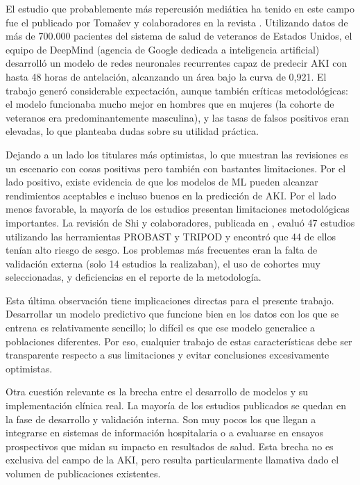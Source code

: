 \documentclass[12pt, a4paper, oneside]{report}
\begin{document}
El estudio que probablemente más repercusión mediática ha tenido en este campo fue el publicado por Tomašev y colaboradores en la revista \parencite{tomasev2019nature}. Utilizando datos de más de 700.000 pacientes del sistema de salud de veteranos de Estados Unidos, el equipo de DeepMind (agencia de Google dedicada a inteligencia artificial) desarrolló un modelo de redes neuronales recurrentes capaz de predecir AKI con hasta 48 horas de antelación, alcanzando un área bajo la curva de 0,921. El trabajo generó considerable expectación, aunque también críticas metodológicas: el modelo funcionaba mucho mejor en hombres que en mujeres (la cohorte de veteranos era predominantemente masculina), y las tasas de falsos positivos eran elevadas, lo que planteaba dudas sobre su utilidad práctica.

Dejando a un lado los titulares más optimistas, lo que muestran las revisiones es un escenario con cosas positivas pero también con bastantes limitaciones. Por el lado positivo, existe evidencia de que los modelos de ML pueden alcanzar rendimientos aceptables e incluso buenos en la predicción de AKI. Por el lado menos favorable, la mayoría de los estudios presentan limitaciones metodológicas importantes. La revisión de Shi y colaboradores, publicada en \parencite{shi2025aiaki}, evaluó 47 estudios utilizando las herramientas PROBAST y TRIPOD y encontró que 44 de ellos tenían alto riesgo de sesgo. Los problemas más frecuentes eran la falta de validación externa (solo 14 estudios la realizaban), el uso de cohortes muy seleccionadas, y deficiencias en el reporte de la metodología.

Esta última observación tiene implicaciones directas para el presente trabajo. Desarrollar un modelo predictivo que funcione bien en los datos con los que se entrena es relativamente sencillo; lo difícil es que ese modelo generalice a poblaciones diferentes. Por eso, cualquier trabajo de estas características debe ser transparente respecto a sus limitaciones y evitar conclusiones excesivamente optimistas.

Otra cuestión relevante es la brecha entre el desarrollo de modelos y su implementación clínica real. La mayoría de los estudios publicados se quedan en la fase de desarrollo y validación interna. Son muy pocos los que llegan a integrarse en sistemas de información hospitalaria o a evaluarse en ensayos prospectivos que midan su impacto en resultados de salud. Esta brecha no es exclusiva del campo de la AKI, pero resulta particularmente llamativa dado el volumen de publicaciones existentes.
\end{document}
